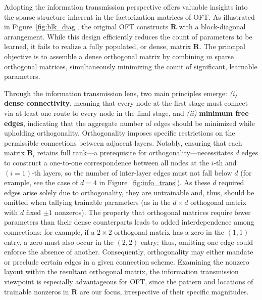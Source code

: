 Adopting the information transmission perspective offers valuable insights into the sparse structure inherent in the factorization matrices of OFT. As illustrated in Figure~\ref{fig:blk_diag}, the original OFT constructs $\bm{R}$ with a block-diagonal arrangement. While this design efficiently reduces the count of parameters to be learned, it fails to realize a fully populated, or dense, matrix $\bm{R}$. The principal objective is to assemble a dense orthogonal matrix by combining $m$ sparse orthogonal matrices, simultaneously minimizing the count of significant, learnable parameters.

Through the information transmission lens, two main principles emerge: \emph{(i)} \textbf{dense connectivity}, meaning that every node at the first stage must connect via at least one route to every node in the final stage, and \emph{(ii)} \textbf{minimum free edges}, indicating that the aggregate number of edges should be minimized while upholding orthogonality. Orthogonality imposes specific restrictions on the permissible connections between adjacent layers. Notably, ensuring that each matrix $\bm{B}_i$ retains full rank—a prerequisite for orthogonality—necessitates $d$ edges to construct a one-to-one correspondence between all nodes at the $i$-th and $(i=1)$-th layers, so the number of inter-layer edges must not fall below $d$ (for example, see the case of $d=4$ in Figure~\ref{fig:info_trans}). As these $d$ required edges arise solely due to orthogonality, they are untrainable and, thus, should be omitted when tallying trainable parameters (as in the $d\times d$ orthogonal matrix with $d$ fixed $\pm1$ nonzeros). The property that orthogonal matrices require fewer parameters than their dense counterparts leads to added interdependence among connections: for example, if a $2\times2$ orthogonal matrix has a zero in the $(1,1)$ entry, a zero must also occur in the $(2,2)$ entry; thus, omitting one edge could enforce the absence of another. Consequently, orthogonality may either mandate or preclude certain edges in a given connection scheme. Examining the nonzero layout within the resultant orthogonal matrix, the information transmission viewpoint is especially advantageous for OFT, since the pattern and locations of trainable nonzeros in $\bm{R}$ are our focus, irrespective of their specific magnitudes.

